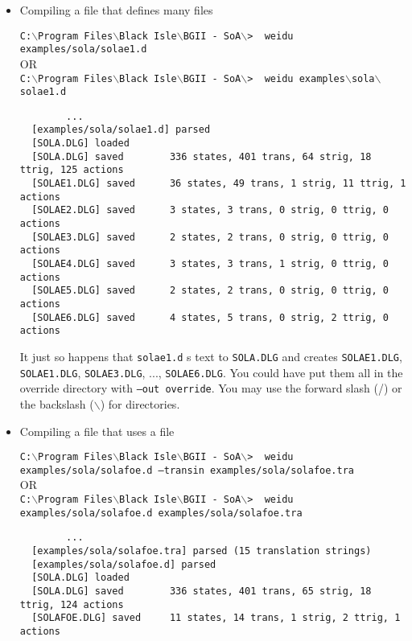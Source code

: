 \documentclass{article}
\def\ttref#1{\ahrefloc{#1}{\tt #1}}
\def\t#1{{\tt #1}}
\def\CMD#1{{\tt {C:$\backslash$Program Files$\backslash$Black Isle$\backslash$BGII - SoA$\backslash$>} \color{red} \t{#1} }}
\begin{document}
\begin{itemize}
  \CMD{ weidu ppworker.d bodhi.d --out test}
\begin{verbatim}
        ...
  [bodhi.d] parsed
  [ppworker.d] parsed
  [BODHI.DLG] saved       135 states, 259 trans, 16 strig, 66 ttrig, 54 actions
  [PPWORKER.DLG] saved    33 states, 81 trans, 4 strig, 12 ttrig, 10 actions
\end{verbatim}

  This creates \t{test/BODHI.DLG} and \t{test/PPWORKER.DLG} based on the
  instructions in \t{bodhi.d} and \t{ppworker.d}.

\item  Compiling a \ttref{D} file that defines many \ttref{DLG} files

  \CMD{ weidu examples/sola/solae1.d}
    \\ OR \\
  \CMD{ weidu examples$\backslash$sola$\backslash$solae1.d}
\begin{verbatim}
        ...
  [examples/sola/solae1.d] parsed
  [SOLA.DLG] loaded
  [SOLA.DLG] saved        336 states, 401 trans, 64 strig, 18 ttrig, 125 actions
  [SOLAE1.DLG] saved      36 states, 49 trans, 1 strig, 11 ttrig, 1 actions
  [SOLAE2.DLG] saved      3 states, 3 trans, 0 strig, 0 ttrig, 0 actions
  [SOLAE3.DLG] saved      2 states, 2 trans, 0 strig, 0 ttrig, 0 actions
  [SOLAE4.DLG] saved      3 states, 3 trans, 1 strig, 0 ttrig, 0 actions
  [SOLAE5.DLG] saved      2 states, 2 trans, 0 strig, 0 ttrig, 0 actions
  [SOLAE6.DLG] saved      4 states, 5 trans, 0 strig, 2 ttrig, 0 actions
\end{verbatim}

  It just so happens that \t{solae1.d} \ttref{APPEND}s text to
  \t{SOLA.DLG} and
  creates \t{SOLAE1.DLG}, \t{SOLAE1.DLG},
  \t{SOLAE3.DLG}, ..., \t{SOLAE6.DLG}. You could
  have put them all in the override directory with \t{--out override}. You
  may use the forward slash (/) or the backslash ($\backslash$) for
  directories.

\item  Compiling a \ttref{D} file that uses a \ttref{TRA} file

  \CMD{ weidu examples/sola/solafoe.d --transin examples/sola/solafoe.tra}
  \\ OR \\
  \CMD{ weidu examples/sola/solafoe.d examples/sola/solafoe.tra}
\begin{verbatim}
        ...
  [examples/sola/solafoe.tra] parsed (15 translation strings)
  [examples/sola/solafoe.d] parsed
  [SOLA.DLG] loaded
  [SOLA.DLG] saved        336 states, 401 trans, 65 strig, 18 ttrig, 124 actions
  [SOLAFOE.DLG] saved     11 states, 14 trans, 1 strig, 2 ttrig, 1 actions
\end{verbatim}


\end{itemize}
\end{document}
